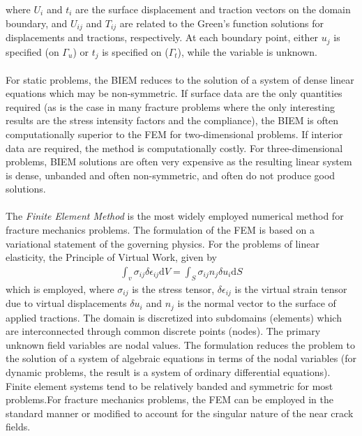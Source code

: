 \documentclass[12pt]{article}
\begin{document}
where $U_i$ and $t_i$ are the surface displacement and traction vectors on the domain boundary, and
$U_{ij}$ and $T_{ij}$ are related to the Green's function solutions for displacements and tractions,
respectively. At each boundary point, either $u_j$ is specified (on $\varGamma_u$) or $t_j$ is specified on ($\varGamma_t$), while
the variable is unknown.
\\\\
For static problems, the BIEM
reduces to the solution of a system of dense linear equations which may be non-symmetric. If
surface data are the only quantities required (as is the case in many fracture problems where the
only interesting results are the stress intensity factors and the compliance), the BIEM is often
computationally superior to the FEM for two-dimensional problems. If interior data are required,
the method is computationally costly. For three-dimensional problems, BIEM solutions are often
very expensive as the resulting linear system is dense, unbanded and often non-symmetric, and often
do not produce good solutions.
\\\\
The \textit{Finite Element Method} is the most widely employed numerical method for fracture mechanics problems.
The formulation of the FEM is based on a variational statement of the governing physics. For the
problems of linear elasticity, the Principle of Virtual Work, given by
\begin{align*}
    \int_{v}\sigma_{ij} \delta \epsilon_{ij} \text{d} V = \int_S \sigma_{ij} n_j \delta u_i \text{d} S \tag{14} \label{14}
\end{align*}
which is employed, where $\sigma_{ij}$ is the stress tensor, $\delta \epsilon_{ij}$ is the virtual strain tensor due to virtual displacements
$\delta u_i$ and $n_j$
is the normal vector to the surface of applied tractions. The domain is discretized into
subdomains (elements) which are interconnected through common discrete points (nodes). The
primary unknown field variables are nodal values. The formulation reduces the problem to the
solution of a system of algebraic equations in terms of the nodal variables (for dynamic problems,
the result is a system of ordinary differential equations). Finite element systems tend to be relatively
banded and symmetric for most problems.For fracture mechanics problems, the FEM can be employed in the standard manner or
modified to account for the singular nature of the near crack fields.
\end{document}
